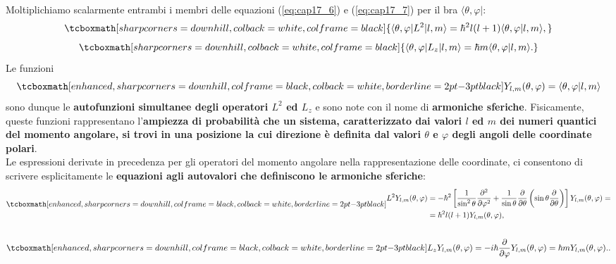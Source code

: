 Moltiplichiamo scalarmente entrambi i membri delle equazioni (\ref{eq:cap17_6}) e (\ref{eq:cap17_7}) per il bra $\langle \theta , \varphi \vert$:
	\begin{equation}
		\tcboxmath[sharp corners=downhill, colback=white, colframe=black]{
			\langle \theta , \varphi \vert L^2 \vert l, m \rangle = \hbar ^2 l(l+1) \langle \theta , \varphi \vert l, m \rangle ,
			}
	\end{equation}
	\begin{equation}
		\tcboxmath[sharp corners=downhill, colback=white, colframe=black]{
			\langle \theta , \varphi \vert L_z \vert l, m \rangle = \hbar m\langle \theta , \varphi \vert l, m \rangle .
			}
	\end{equation}
Le funzioni
	\begin{equation}
		\tcboxmath[enhanced, sharp corners=downhill, colframe=black, colback=white, borderline={2pt}{-3pt}{black}]{
			Y_{l,m} (\theta, \varphi )= \langle \theta , \varphi \vert l, m \rangle 
			}
	\end{equation}
sono dunque le \textbf{autofunzioni simultanee degli operatori $L^2$ ed $L_z$} e sono note con il nome di \textbf{armoniche sferiche}. Fisicamente, queste funzioni rappresentano l'\textbf{ampiezza di probabilità che un sistema, caratterizzato dai valori $l$ ed $m$ dei numeri quantici del momento angolare, si trovi in una posizione la cui direzione è definita dal valori $\theta$ e $\varphi$ degli angoli delle coordinate polari}.\\

Le espressioni derivate in precedenza per gli operatori del momento angolare nella rappresentazione delle coordinate, ci consentono di scrivere esplicitamente le \textbf{equazioni agli autovalori che definiscono le armoniche sferiche}:
	\begin{align}
		\tcboxmath[enhanced, sharp corners=downhill, colframe=black, colback=white, borderline={2pt}{-3pt}{black}]{
		\begin{aligned}
			L^2 Y_{l,m} (\theta, \varphi) &=-\hbar ^2 \left[\frac{1}{\sin ^2 \theta}\frac{\partial ^2}{\partial \varphi ^2}+\frac{1}{\sin \theta}\frac{\partial}{\partial \theta} \left(\sin \theta \frac{\partial}{\partial \theta}\right)\right]Y_{l,m}(\theta, \varphi) =   \\
			&= \hbar ^2 l(l+1)Y_{l,m}(\theta, \varphi) ,
		\end{aligned}
		}\nonumber \\
		\quad
	\label{eq:cap17_8}
	\end{align}
	\begin{equation}
		\tcboxmath[enhanced, sharp corners=downhill, colframe=black, colback=white, borderline={2pt}{-3pt}{black}]{
			L_zY_{l,m}(\theta, \varphi)= -i\hbar \frac{\partial}{\partial \varphi}Y_{l,m}(\theta, \varphi)= \hbar m Y_{l,m}(\theta, \varphi).
			}
	\label{eq:cap17_9}.
	\end{equation}\\

